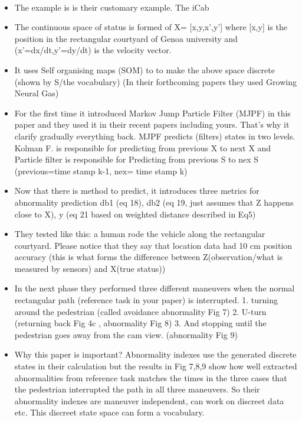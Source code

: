 \documentclass{article}
\begin{document}
			\paragraph{\cite{baydoun-2018-learning-switching-models-for-abnormality-detection-for-autonomous-driving}}
				\begin{itemize}
					\item The example is is their customary example. The iCab 
					\item The continuous space of status is formed of X= [x,y,x',y'] where [x,y] is the position in the rectangular courtyard of Genoa university and (x'=dx/dt,y'=dy/dt)  is the velocity vector.
					\item It uses Self organising maps (SOM) to to make the above space discrete (shown by S/the vocabulary) (In their forthcoming papers they used Growing Neural Gas)
					\item For the first time it introduced Markov Jump Particle Filter (MJPF) in this paper and they used it in their recent papers including yours. That's why it clarify gradually everything back. MJPF predicts (filters) states in two levels. Kolman F. is responsible for predicting from previous X to next X and Particle filter is responsible for Predicting from previous S to nex S (previous=time stamp k-1, nex= time stamp k) 
					\item Now that there is method to predict, it introduces three metrics for abnormality prediction db1 (eq 18), db2 (eq 19, just assumes that Z happens close to X), y (eq 21 based on weighted distance described in Eq5)
					\item They tested like this: a human rode the vehicle along the rectangular courtyard.  Please notice that they say that location data had 10 cm position accuracy (this is what forms the difference between Z(observation/what is measured by sensors) and X(true status))
					\item In the next phase they performed three different maneuvers when the normal rectangular path (reference task in your paper) is interrupted. 1. turning around the pedestrian (called avoidance abnormality Fig 7) 2. U-turn (returning back Fig 4c , abnormality Fig 8) 3. And stopping until the pedestrian goes away from the cam view. (abnormality Fig 9)
					\item Why this paper is important? Abnormality indexes use the generated discrete states in their calculation but the results in Fig 7,8,9 show how well extracted abnormalities from reference task matches the times in the three cases that the pedestrian interrupted the path in all three maneuvers.  So their abnormality indexes are maneuver independent, can work on discreet data etc. This discreet state space can form a vocabulary.
				\end{itemize}
\end{document}

